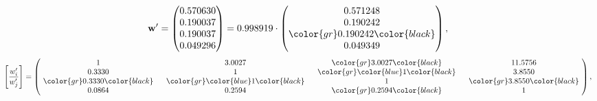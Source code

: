 \begin{example}
\begin{equation*}
\mathbf{w}^{\prime} =
\begin{pmatrix}
0.570630\\
0.190037\\
0.190037\\
0.049296
\end{pmatrix} =
0.998919\cdot
\begin{pmatrix}
0.571248\\
0.190242\\
\color{gr} 0.190242\color{black} \\
0.049349
\end{pmatrix},
\end{equation*}
\begin{equation*}
\left[ \frac{{w}^{\prime}_i}{{w}^{\prime}_j} \right] =
\begin{pmatrix}
$\,\,$ 1 $\,\,$ & $\,\,$3.0027$\,\,$ & $\,\,$\color{gr} 3.0027\color{black} $\,\,$ & $\,\,$11.5756$\,\,$ \\
$\,\,$0.3330$\,\,$ & $\,\,$ 1 $\,\,$ & $\,\,$\color{gr} \color{blue} 1\color{black} $\,\,$ & $\,\,$3.8550  $\,\,$ \\
$\,\,$\color{gr} 0.3330\color{black} $\,\,$ & $\,\,$\color{gr} \color{blue} 1\color{black} $\,\,$ & $\,\,$ 1 $\,\,$ & $\,\,$\color{gr} 3.8550\color{black}  $\,\,$ \\
$\,\,$0.0864$\,\,$ & $\,\,$0.2594$\,\,$ & $\,\,$\color{gr} 0.2594\color{black} $\,\,$ & $\,\,$ 1  $\,\,$ \\
\end{pmatrix},
\end{equation*}
\end{example}
\newpage
